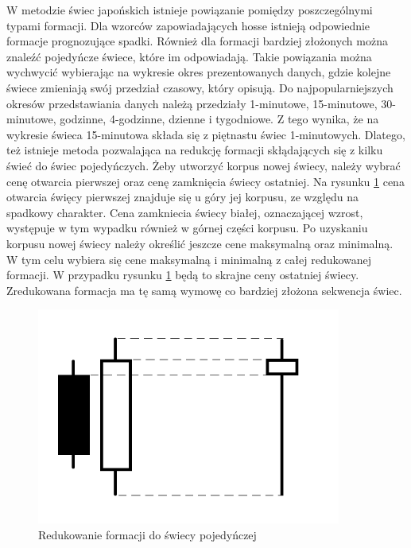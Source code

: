 \documentclass[pdflatex,11pt]{aghdpl}
\begin{document}
W metodzie świec japońskich istnieje powiązanie pomiędzy poszczególnymi typami formacji. Dla wzorców zapowiadających hosse istnieją odpowiednie formacje prognozujące spadki. Również dla formacji bardziej złożonych można znaleźć pojedyńcze świece, które im odpowiadają. Takie powiązania można wychwycić wybierając na wykresie okres prezentowanych danych, gdzie kolejne świece zmieniają swój przedział czasowy, który opisują. Do najpopularniejszych okresów przedstawiania danych należą przedziały 1-minutowe, 15-minutowe, 30-minutowe, godzinne, 4-godzinne, dzienne i tygodniowe. Z tego wynika, że na wykresie świeca 15-minutowa składa się z piętnastu świec 1-minutowych. Dlatego, też istnieje metoda pozwalająca na redukcję formacji skłądających się z kilku świeć do świec pojedyńczych. Żeby utworzyć korpus nowej świecy, należy wybrać cenę otwarcia pierwszej oraz cenę zamknięcia świecy ostatniej. Na rysunku \ref{redukcja} cena otwarcia święcy pierwszej znajduje się u góry jej korpusu, ze względu na spadkowy charakter. Cena zamkniecia świecy białej, oznaczającej wzrost, występuje w tym wypadku również w górnej części korpusu. Po uzyskaniu korpusu nowej świecy należy określić jeszcze cene maksymalną oraz minimalną. W tym celu wybiera się cene maksymalną i minimalną z całej redukowanej formacji. W przypadku rysunku \ref{redukcja} będą to skrajne ceny ostatniej świecy. Zredukowana formacja ma tę samą wymowę co bardziej złożona sekwencja świec. 
\begin{figure}[ht]
\begin{center}
\includegraphics[width=10cm]{reduction.png}
\caption{Redukowanie formacji do świecy pojedyńczej}
\label{redukcja}
\end{center}
\end{figure} 
\end{document}
